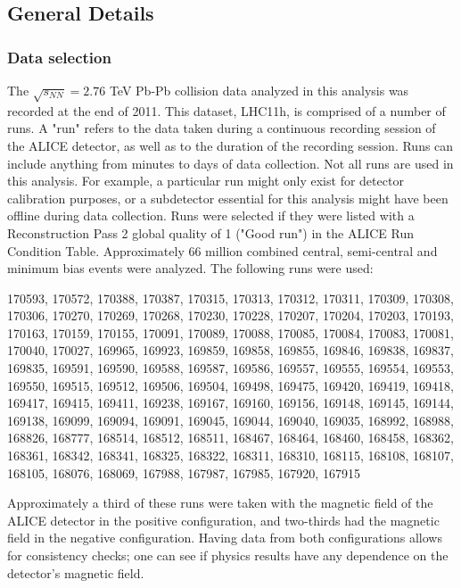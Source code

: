 \subsection{General Details}
\label{sec:GeneralDetails}

\subsubsection{Data selection}
\label{sec:DataSelection}

The $\sqrt{s_{NN}}=2.76$ TeV Pb-Pb collision data analyzed in this analysis was recorded at the end of 2011.
This dataset, LHC11h, is comprised of a number of runs.
A "run" refers to the data taken during a continuous recording session of the ALICE detector, as well as to the duration of the recording session.
Runs can include anything from minutes to days of data collection.
Not all runs are used in this analysis.
For example, a particular run might only exist for detector calibration purposes, or a subdetector essential for this analysis might have been offline during data collection.
Runs were selected if they were listed with a Reconstruction Pass 2 global quality of 1 ("Good run") in the ALICE Run Condition Table. 
Approximately 66 million combined central, semi-central and minimum bias events were analyzed. 
The following runs were used:

170593, 170572, 170388, 170387, 170315, 170313, 170312, 170311, 170309, 170308, 170306, 170270, 170269, 170268, 170230, 170228, 170207, 170204, 170203, 170193, 170163, 170159, 170155, 170091, 170089, 170088, 170085, 170084, 170083, 170081, 170040, 170027, 169965, 169923, 169859, 169858, 169855, 169846, 169838, 169837, 169835, 169591, 169590, 169588, 169587, 169586, 169557, 169555, 169554, 169553, 169550, 169515, 169512, 169506, 169504, 169498, 169475, 169420, 169419, 169418, 169417, 169415, 169411, 169238, 169167, 169160, 169156, 169148, 169145, 169144, 169138, 169099, 169094, 169091, 169045, 169044, 169040, 169035, 168992, 168988, 168826, 168777, 168514, 168512, 168511, 168467, 168464, 168460, 168458, 168362, 168361, 168342, 168341, 168325, 168322, 168311, 168310, 168115, 168108, 168107, 168105, 168076, 168069, 167988, 167987, 167985, 167920, 167915

Approximately a third of these runs were taken with the magnetic field of the ALICE detector in the positive configuration, and two-thirds had the magnetic field in the negative configuration.
Having data from both configurations allows for consistency checks; one can see if physics results have any dependence on the detector's magnetic field.

